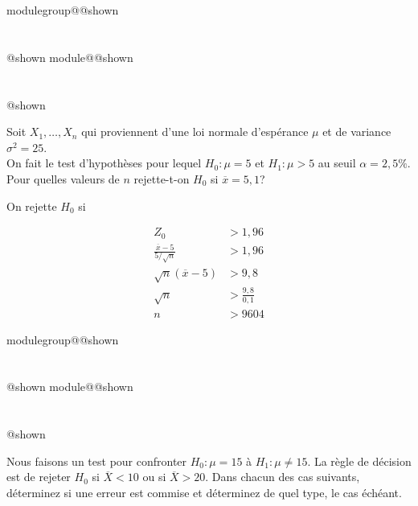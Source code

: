 \documentclass{Evaluation}
\makeatletter
\newcommand{\currentmodulekey}{}
\newcommand{\currentmoduletitle}{}
\newcommand{\currentgroupkey}{}
\newcommand{\currentgrouptitle}{}
\newcommand{\showmoduleifneeded}{%
  \ifx\currentgroupkey\empty\else
    \expandafter\ifx\csname modulegroup@\currentgroupkey @shown\endcsname\relax
      \section*{\currentgrouptitle}%
      \expandafter\gdef\csname modulegroup@\currentgroupkey @shown\endcsname{1}%
    \fi
  \fi
  \expandafter\ifx\csname module@\currentmodulekey @shown\endcsname\relax
    \section*{\currentmoduletitle}%
    \expandafter\gdef\csname module@\currentmodulekey @shown\endcsname{1}%
  \fi
}
\newenvironment{H26}{\showmoduleifneeded}{}
\makeatother
\begin{document}
\begin{questions}
\begin{H26}
\question {} %
Soit $X_1,\hdots, X_{n}$ qui proviennent d'une loi normale d'espérance $\mu$ et de variance $\sigma^2=25$. \\
On fait le test d'hypothèses pour lequel
$H_0:\mu=5$ et $H_1:\mu>5$ au seuil $\alpha=2,5\%$.\\
Pour quelles valeurs de $n$ rejette-t-on $H_0$ si $\overline{x}=5,1$?

\begin{solution}
    On rejette $H_0$ si 

    \begin{align*}
        Z_0&>1,96\\
        \frac{\overline{x}-5}{5/\sqrt{n}}&>1,96\\
        \sqrt{n}(\overline{x}-5)&>9,8\\
        \sqrt{n}&>\frac{9,8}{0,1}\\
        n&>9604
    \end{align*}
\end{solution}
\end{H26}

\begin{H26}
\question {} %
Nous faisons un test pour confronter $H_0: \mu=15$ à $H_1:\mu\neq15$. La règle de décision est de rejeter $H_0$ si $\overline{X}<10$ ou si $\overline{X}>20$. Dans chacun des cas suivants, déterminez si une erreur est commise et déterminez de quel type, le cas échéant. 

\end{H26}
\end{questions}
\end{document}
